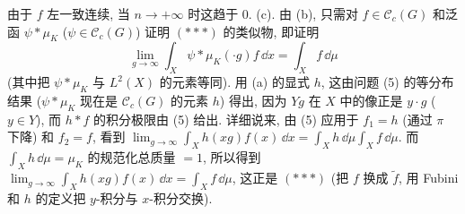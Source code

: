 \begin{solution}
\[\]
由于 $f$ 左一致连续, 当 $n \to +\infty$ 时这趋于 $0$.
(c). 由 (b), 只需对 $f \in \mathcal{C}_c(G)$ 和泛函 $\psi * \mu_K$ ($\psi \in \mathcal{C}_c(G)$) 证明 $(***)$ 的类似物, 即证明
\[
\lim_{g \to \infty}\int_X \psi * \mu_K(\cdot g)f\,\dd x = \int_X f\,\dd\mu
\]
(其中把 $\psi * \mu_K$ 与 $L^2(X)$ 的元素等同). 用 (a) 的显式 $h$, 这由问题 (5) 的等分布结果 ($\psi * \mu_K$ 现在是 $\mathcal{C}_c(G)$ 的元素 $h$) 得出, 因为 $Yg$ 在 $X$ 中的像正是 $y \cdot g$ ($y \in Y$), 而 $h * f$ 的积分极限由 (5) 给出. 详细说来, 由 (5) 应用于 $f_1 = h$ (通过 $\pi$ 下降) 和 $f_2 = f$, 看到 $\lim_{g \to \infty}\int_X h(xg)f(x)\,\dd x = \int_X h\,\dd\mu \int_X f\,\dd\mu$. 而 $\int_X h\,\dd\mu = \mu_K$ 的规范化总质量 $= 1$, 所以得到 $\lim_{g \to \infty}\int_X h(xg)f(x)\,\dd x = \int_X f\,\dd\mu$, 这正是 $(***)$ (把 $f$ 换成 $\tilde{f}$, 用 Fubini 和 $h$ 的定义把 $y$-积分与 $x$-积分交换).
\end{solution}
